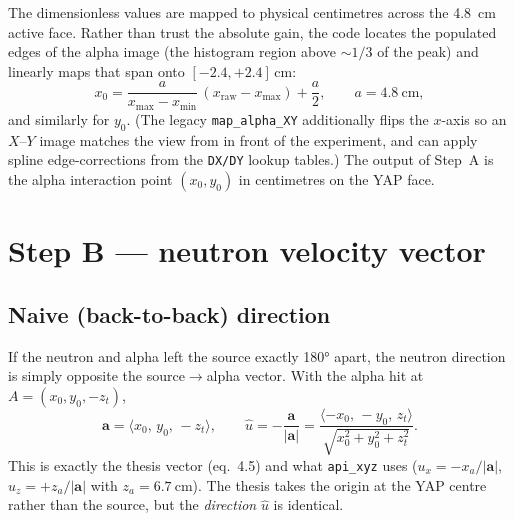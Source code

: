 \documentclass[11pt]{article}
\newcommand{\code}[1]{\texttt{\small #1}}
\begin{document}
The dimensionless values are mapped to physical centimetres across the
\SI{4.8}{\cm} active face. Rather than trust the absolute gain, the code locates
the populated edges of the alpha image (the histogram region above ${\sim}1/3$ of
the peak) and linearly maps that span onto $[-2.4,+2.4]\,\si{\cm}$:
\begin{equation}
  x_0=\frac{a}{x_{\max}-x_{\min}}\,(x_{\mathrm{raw}}-x_{\max})+\frac{a}{2},
  \qquad a=\SI{4.8}{\cm},
\end{equation}
and similarly for $y_0$. (The legacy \code{map\_alpha\_XY} additionally flips the
$x$-axis so an $X$--$Y$ image matches the view from in front of the experiment,
and can apply spline edge-corrections from the \code{DX/DY} lookup tables.) The
output of Step~A is the alpha interaction point $(x_0,y_0)$ in centimetres on the
YAP face.

\section{Step B --- neutron velocity vector}

\subsection{Naive (back-to-back) direction}
If the neutron and alpha left the source exactly \ang{180} apart, the neutron
direction is simply opposite the source$\rightarrow$alpha vector. With the alpha
hit at $A=(x_0,y_0,-z_t)$,
\begin{equation}
  \bm a=\langle x_0,\,y_0,\,-z_t\rangle,\qquad
  \hat u=-\frac{\bm a}{|\bm a|}
        =\frac{\langle -x_0,\,-y_0,\,z_t\rangle}{\sqrt{x_0^2+y_0^2+z_t^2}}.
\end{equation}
This is exactly the thesis vector (eq.~4.5) and what \code{api\_xyz} uses
($u_x=-x_a/|\bm a|$, $u_z=+z_a/|\bm a|$ with $z_a=\SI{6.7}{\cm}$). The thesis
takes the origin at the YAP centre rather than the source, but the
\emph{direction} $\hat u$ is identical.
\end{document}
